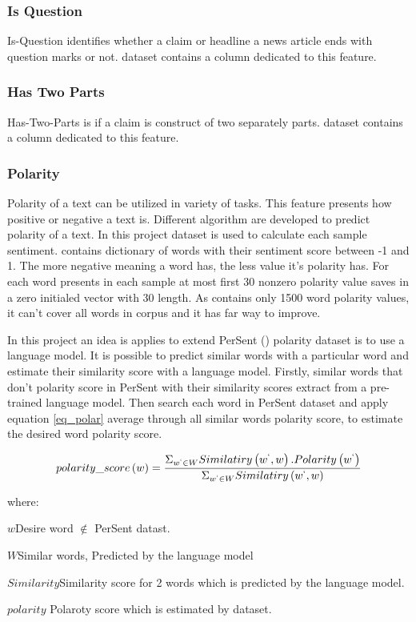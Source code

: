 \subsubsection{Is Question}
Is-Question identifies whether a claim or headline a news article ends with question marks or not. \cite{stance_persian} dataset contains a column dedicated to this feature.
\subsubsection{Has Two Parts}
Has-Two-Parts is if a claim is construct of two separately parts. \cite{stance_persian} dataset contains a column dedicated to this feature.
\subsubsection{Polarity}  
Polarity of a text can be utilized in variety of tasks. This feature presents how positive or negative a text is. Different algorithm are developed to predict polarity of a text. In this project \cite{persent} dataset is used to calculate each sample sentiment. \cite{persent} contains dictionary of words with their sentiment score between -1 and 1. The more negative meaning a word has, the less value it's polarity has. For each word presents in each sample at most first 30 nonzero polarity value saves in a zero initialed vector with 30 length. As \cite{persent} contains only 1500 word polarity values, it can't cover all words in corpus and it has far way to improve. 

In this project an idea is applies to extend PerSent (\cite{persent}) polarity dataset is to use a language model. It is possible to predict similar words with a particular word and estimate their similarity score with a language model. Firstly, similar words that don't polarity score in PerSent with their similarity scores extract from a pre-trained language model. Then search each word in PerSent dataset and apply equation \ref{eq_polar} average through all similar words polarity score, to estimate the desired word polarity score.

\begin{equation}
	\label{eq_polar}
	polarity\_score\left(w\right) = \frac{\Sigma_{w^{`} \in W} Similatiry\left(w^{`}, w\right) . Polarity\left(w^{`}\right)}{\Sigma_{w^{`} \in W} Similatiry\left(w^{`}, w\right)}
\end{equation}

where: 
\begin{eqexpl}[25mm]
	\item{$w$}Desire word $\notin$ PerSent datast.
	\item{$W$}Similar words, Predicted by the language model
	\item{$Similarity$}Similarity score for 2 words which is predicted by the language model.
	\item{$polarity$} Polaroty score which is estimated by \cite{persent} dataset.
\end{eqexpl}

